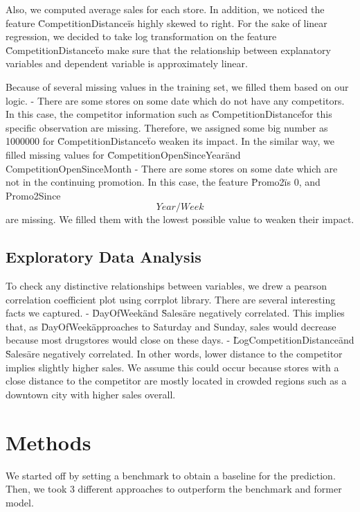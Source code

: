 \documentclass[letterpaper,twocolumn,10pt]{article}
\begin{document}

Also, we computed average sales for each store. In addition, we noticed the feature \"CompetitionDistance\" is highly skewed to right. For the sake of linear regression, we decided to take log transformation on the feature \"CompetitionDistance\" to make sure that the relationship between explanatory variables and dependent variable is approximately linear.


Because of several missing values in the training set, we filled them based on our logic.
- There are some stores on some date which do not have any competitors. In this case, the competitor information such as \"CompetitionDistance\" for this specific observation are missing. Therefore, we assigned some big number as 1000000 for \"CompetitionDistance\" to weaken its impact. In the similar way, we filled missing values for \"CompetitionOpenSinceYear\" and CompetitionOpenSinceMonth
- There are some stores on some date which are not in the continuing promotion. In this case, the feature \"Promo2\" is 0, and Promo2Since\[Year/Week\] are missing. We filled them with the lowest possible value to weaken their impact. 


\subsection{Exploratory Data Analysis}
To check any distinctive relationships between variables, we drew a pearson correlation coefficient plot using corrplot library. There are several interesting facts we captured. 
- \"DayOfWeek\" and \"Sales\" are negatively correlated. This implies that, as \"DayOfWeek\" approaches to Saturday and Sunday, sales would decrease because most drugstores would close on these days.
- \"LogCompetitionDistance\" and \"Sales\" are negatively correlated. In other words, lower distance to the competitor implies slightly higher sales. We assume this could occur because stores with a close distance to the competitor are mostly located in crowded regions such as a downtown city with higher sales overall.




\section{Methods}
We started off by setting a benchmark to obtain a baseline for the prediction. Then, we took 3 different approaches to outperform the benchmark and former model.  
\end{document}
